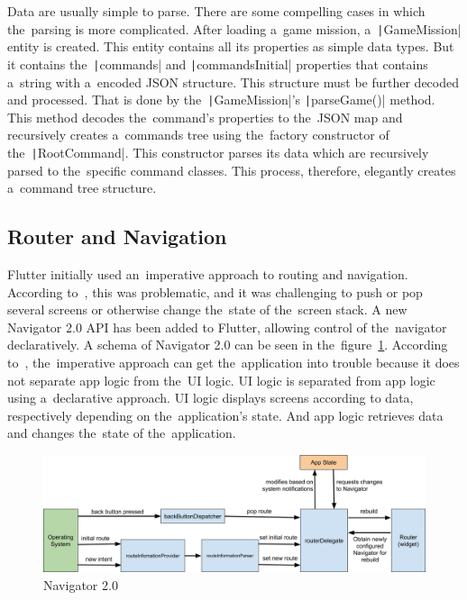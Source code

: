 Data are usually simple to parse.
There are some compelling cases in which the~parsing is more complicated.
After loading a~game mission, a~\texttt|GameMission| entity is created.
This entity contains all its properties as simple data types.
But it contains the~\texttt|commands| and \texttt|commandsInitial| properties that contains a~string with a~encoded JSON structure.
This structure must be further decoded and processed.
That is done by the~\texttt|GameMission|'s \texttt|parseGame()| method.
This method decodes the~command's properties to the~JSON map and recursively creates a~commands tree using the~factory constructor of the~\texttt|RootCommand|.
This constructor parses its data which are recursively parsed to the~specific command classes.
This process, therefore, elegantly creates a~command tree structure.

\subsection{Router and Navigation}

Flutter initially used an~imperative approach to routing and navigation.
According to~\cite{ryan_2020_navigator}, this was problematic, and it was challenging to push or pop several screens or otherwise change the~state of the~screen stack.
A new Navigator 2.0 API has been added to Flutter, allowing control of the~navigator declaratively.
A schema of Navigator 2.0 can be seen in the~figure~\ref{fig:navigator}.
According to~\cite{kietay_2021_navigator}, the~imperative approach can get the~application into trouble because it does not separate app logic from the~UI logic.
UI logic is separated from app logic using a~declarative approach.
UI logic displays screens according to data, respectively depending on the~application's state.
And app logic retrieves data and changes the~state of the~application.

\begin{figure}
    \centering
    \includegraphics[width=1\linewidth]{assets/implementation/navigator.png}
    \caption{Navigator 2.0~\cite{ryan_2020_navigator}}
    \label{fig:navigator}
\end{figure}


